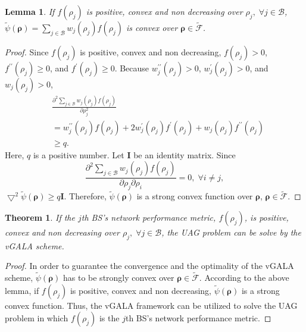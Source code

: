 \documentclass[journal]{IEEEtran}
\newtheorem{theorem}{Theorem}
\newtheorem{lemma}{Lemma}
\theoremstyle{definition}
\begin{document}
\begin{lemma}
\label{thm:gen_lemma}
If $f(\rho_{j})$ is positive, convex and non decreasing over $\rho_{j},\; \forall j\in\mathcal{B}$, $\tilde{\psi}(\boldsymbol{\rho})=\sum_{j\in\mathcal{B}}w_{j}(\rho_{j})f(\rho_{j})$ is convex over $\boldsymbol{\rho}\in \mathcal{\tilde{F}}$.
\end{lemma}
\begin{proof}
Since $f(\rho_{j})$ is positive, convex and non decreasing, $f(\rho_{j})>0$, $f^{\prime\prime}(\rho_{j})\geq 0$, and $f^{\prime}(\rho_{j})\geq 0$. Because $w_{j}^{\prime\prime}(\rho_{j})> 0$, $w_{j}^{\prime}(\rho_{j})> 0$, and $w_{j}(\rho_{j})> 0$,
\begin{align}
&\frac{\partial^{2}\sum_{j\in\mathcal{B}}w_{j}(\rho_{j})f(\rho_{j})}{\partial\rho_{j}^{2}}\nonumber\\
&=w_{j}^{\prime\prime}(\rho_{j})f(\rho_{j})+2w_{j}^{\prime}(\rho_{j})f^{\prime}(\rho_{j})+w_{j}(\rho_{j})f^{\prime\prime}(\rho_{j}) \nonumber\\
&\geq q.
\end{align}
Here, $q$ is a positive number. Let $\boldsymbol{I}$ be an identity matrix.
Since
\begin{equation}
\frac{\partial^{2}\sum_{j\in\mathcal{B}}w_{j}(\rho_{j})f(\rho_{j})}{\partial\rho_{j}\partial\rho_{i}}=0, \; \forall i\neq j,
\end{equation}
$\bigtriangledown^{2}\tilde{\psi}(\boldsymbol{\rho})\geq q\boldsymbol{I}$. Therefore, $\tilde{\psi}(\boldsymbol{\rho})$ is a strong convex function over $\boldsymbol{\rho}$, $\boldsymbol{\rho}\in \mathcal{\tilde{F}}$.
\end{proof}

\begin{theorem}
\label{thm:gen_vgala}
If the $j$th BS's network performance metric, $f(\rho_{j})$, is positive, convex and non decreasing over $\rho_{j},\; \forall j\in\mathcal{B}$, the UAG problem can be solve by the vGALA scheme.
\end{theorem}
\begin{proof}
\label{prf:gen_vgala}
In order to guarantee the convergence and the optimality of the vGALA scheme, $\tilde{\psi}(\boldsymbol{\rho})$ has to be strongly convex over $\boldsymbol{\rho}\in\mathcal{\tilde{F}}$. According to the above lemma, if $f(\rho_{j})$ is positive, convex and non decreasing, $\tilde{\psi}(\boldsymbol{\rho})$ is a strong convex function. Thus, the vGALA framework can be utilized to solve the UAG problem in which $f(\rho_{j})$ is the $j$th BS's network performance metric.
\end{proof}
\end{document}
